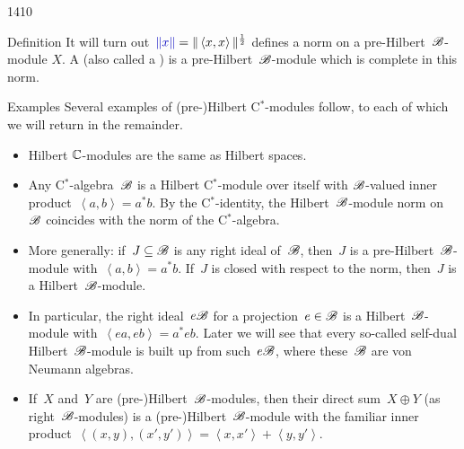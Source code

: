 \begin{parsec}{1410}
\begin{point}{20}{Definition}
It will turn out~$\Define{\| x \|} = \| \left<x,x\right> \|^{\frac{1}{2}}$
        defines a norm on a pre-Hilbert~$\mathscr{B}$-module $X$.
A 
    (also called a )
    is a pre-Hilbert~$\mathscr{B}$-module
    which is complete in this norm.
\end{point}
\begin{point}{30}{Examples}%
Several examples of (pre-)Hilbert C$^*$-modules follow,
    to each of which we will return in the remainder.
\begin{itemize}
\item
Hilbert $\mathbb{C}$-modules are the same as Hilbert spaces.

\item
Any C$^*$-algebra~$\mathscr{B}$ is a Hilbert C$^*$-module over itself
    with $\mathscr{B}$-valued inner product~$\left<a,b\right> = a^*b$.
By the C$^*$-identity, the Hilbert~$\mathscr{B}$-module
    norm on~$\mathscr{B}$ coincides with
    the norm of the C$^*$-algebra.

\item
More generally: if~$J \subseteq \mathscr{B}$
    is any right ideal of~$\mathscr{B}$,
    then~$J$ is a pre-Hilbert~$\mathscr{B}$-module
    with~$\left<a,b\right> = a^*b$.
If~$J$ is closed with respect to the norm, then~$J$ is a Hilbert~$\mathscr{B}$-module.

\item
In particular, the right ideal~$e \mathscr{B}$ for a projection~$e \in \mathscr{B}$
    is a Hilbert~$\mathscr{B}$-module with~$\left<ea,eb\right> = a^*eb$.
Later we will see that every so-called self-dual
    Hilbert~$\mathscr{B}$-module is built up from such~$e \mathscr{B}$,
            where these~$\mathscr{B}$ are von Neumann algebras.
    
\item
If~$X$ and~$Y$ are (pre-)Hilbert~$\mathscr{B}$-modules,
        then their direct sum~$X \oplus Y$ (as right~$\mathscr{B}$-modules)
    is a (pre-)Hilbert~$\mathscr{B}$-module
    with the familiar inner product~$\left<(x,y), (x',y')\right>
                = \left<x,x'\right>+\left<y,y'\right>$.
\end{itemize}
\end{point}
\end{parsec}
